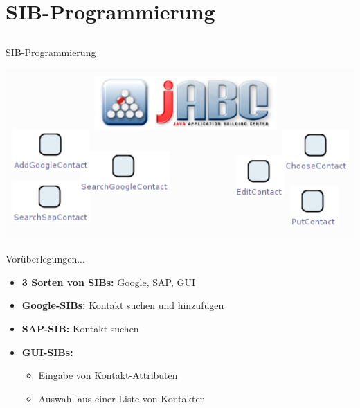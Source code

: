 \section{SIB-Programmierung}

\subsection*{}
\begin{frame}{SIB-Programmierung}
	\begin{center}
		\includegraphics[width=\textheight]{Bilder/titel_sibs.png}
	\end{center}
\end{frame}


\begin{frame}{Vorüberlegungen...}
\begin{itemize}
	\item \textbf{3 Sorten von SIBs:} Google, SAP, GUI
	\pause
	\item \textbf{Google-SIBs:} Kontakt suchen und hinzufügen
	\item \textbf{SAP-SIB:} Kontakt suchen
	\pause
	\item \textbf{GUI-SIBs:}
		\begin{itemize}
			\item Eingabe von Kontakt-Attributen
			\item Auswahl aus einer Liste von Kontakten
		\end{itemize}

\end{itemize}
\end{frame}



